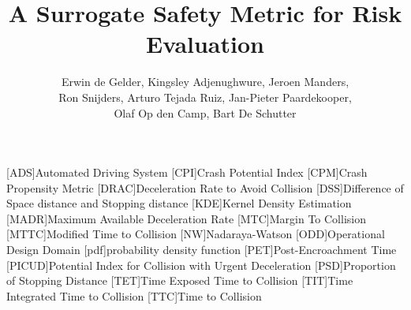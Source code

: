 \documentclass{article}
\title{A Surrogate Safety Metric for Risk Evaluation}
\author{Erwin de Gelder, Kingsley Adjenughwure, Jeroen Manders, \\
Ron Snijders, Arturo Tejada Ruiz, Jan-Pieter Paardekooper, \\
Olaf Op den Camp, Bart De Schutter}
\date{}
\begin{document}
\begin{acronym}[AAAAAAAA]
	[ADS]{Automated Driving System}
	[CPI]{Crash Potential Index}
	[CPM]{Crash Propensity Metric}
	[DRAC]{Deceleration Rate to Avoid Collision}
	[DSS]{Difference of Space distance and Stopping distance}
	[KDE]{Kernel Density Estimation}
	[MADR]{Maximum Available Deceleration Rate}
	[MTC]{Margin To Collision}
	[MTTC]{Modified Time to Collision}
	[NW]{Nadaraya-Watson}
	[ODD]{Operational Design Domain}
	[pdf]{probability density function}
	[PET]{Post-Encroachment Time}
	[PICUD]{Potential Index for Collision with Urgent Deceleration}
	[PSD]{Proportion of Stopping Distance}
	[TET]{Time Exposed Time to Collision}
	[TIT]{Time Integrated Time to Collision}
	[TTC]{Time to Collision}
\end{acronym}

\maketitle











\printbibliography
\end{document}
